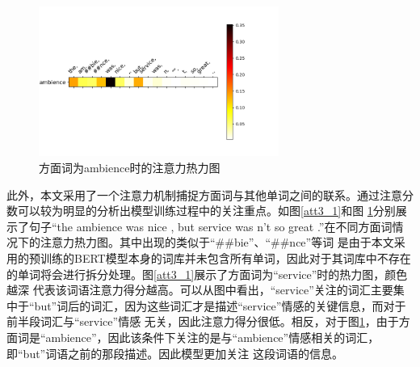 \begin{figure}[htb]
    \setlength{\belowcaptionskip}{0pt}
    \centering
    \includegraphics[width=0.7\textwidth]{pic/att3_2.png}
    \caption{方面词为ambience时的注意力热力图}
    \label{att3_2}
\end{figure}




此外，本文采用了一个注意力机制捕捉方面词与其他单词之间的联系。通过注意分数可以较为明显的分析出模型训练过程中的关注重点。如图\ref{att3_1}和图
\ref{att3_2}分别展示了句子“the ambience was nice , but service was n't so great .”在不同方面词情况下的注意力热力图。其中出现的类似于“\#\#bie”、“\#\#nce”等词
是由于本文采用的预训练的BERT模型本身的词库并未包含所有单词，因此对于其词库中不存在的单词将会进行拆分处理。图\ref{att3_1}展示了方面词为“service”时的热力图，颜色越深
代表该词语注意力得分越高。可以从图中看出，“service”关注的词汇主要集中于“but”词后的词汇，因为这些词汇才是描述“service”情感的关键信息，而对于前半段词汇与“service”情感
无关，因此注意力得分很低。相反，对于图\ref{att3_2}，由于方面词是“ambience”，因此该条件下关注的是与“ambience”情感相关的词汇，即“but”词语之前的那段描述。因此模型更加关注
这段词语的信息。

